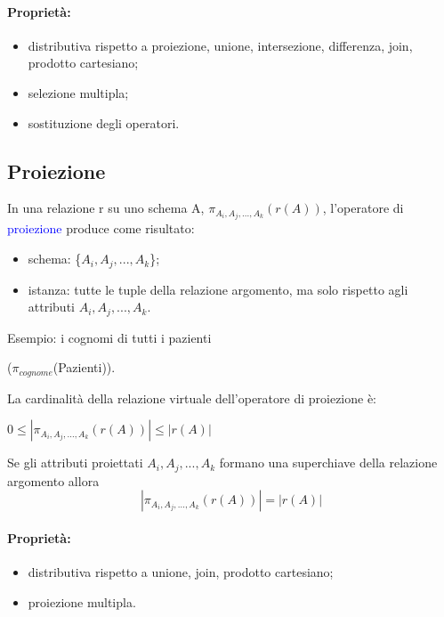 \paragraph{Proprietà:} 
\begin{itemize}
    \item distributiva rispetto a proiezione, unione, intersezione, differenza, join, prodotto cartesiano;
    \item selezione multipla;
    \item sostituzione degli operatori.
\end{itemize}

\subsection{Proiezione}

\label{Proiezione}

In una relazione r su uno schema A, $\pi_{A_i, A_j,..., A_k}(r(A))$, l’operatore di \textcolor{blue}{proiezione} produce come risultato:
\begin{itemize}
    \item schema: \{$A_i, A_j,..., A_k$\};
    \item istanza: tutte le tuple della relazione argomento, ma solo rispetto agli attributi $A_i, A_j,..., A_k$.
\end{itemize}

Esempio: i cognomi di tutti i pazienti 

($\pi_{cognome}$(Pazienti)).

La cardinalità della relazione virtuale dell'operatore di proiezione è: 

$0 \leq |\pi_{A_i, A_j,..., A_k}(r(A))| \leq |r(A)|$

Se gli attributi proiettati $A_i, A_j,..., A_k$ formano una superchiave della relazione argomento allora $$|\pi_{A_i, A_j,..., A_k}(r(A))| = |r(A)|$$

\paragraph{Proprietà:} 
\begin{itemize}
    \item distributiva rispetto a unione, join, prodotto cartesiano;
    \item proiezione multipla.
\end{itemize}

